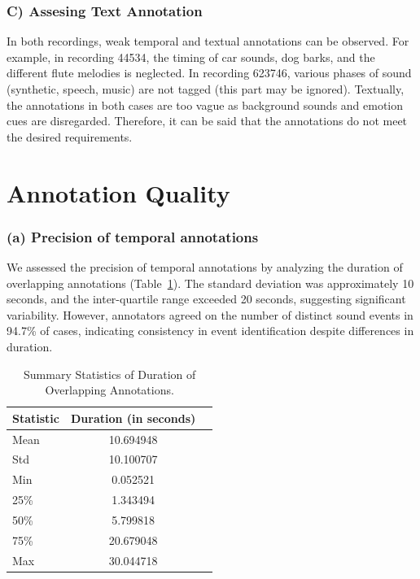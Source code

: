 \documentclass[runningheads]{llncs}
\begin{document}
\subsubsection{C) Assesing Text Annotation}

In both recordings, weak temporal and textual annotations can be observed. For example, in recording 44534, the timing of car sounds, dog barks, and the different flute melodies is neglected. In recording 623746, various phases of sound (synthetic, speech, music) are not tagged (this part may be ignored). Textually, the annotations in both cases are too vague as background sounds and emotion cues are disregarded. Therefore, it can be said that the annotations do not meet the desired requirements.




\section{Annotation Quality}

\subsubsection{(a) Precision of temporal annotations}
We assessed the precision of temporal annotations by analyzing the duration of overlapping annotations (Table~\ref{tab:dur}). The standard deviation was approximately 10 seconds, and the inter-quartile range exceeded 20 seconds, suggesting significant variability.
However, annotators agreed on the number of distinct sound events in 94.7\% of cases, indicating consistency in event identification despite differences in duration. 

\begin{table}[h]
    \caption{Summary Statistics of Duration of Overlapping Annotations.}
    \label{tab:dur}
    \centering
    \begin{tabular}{lcl}
        \toprule
        Statistic & Duration (in seconds) \\ \midrule
        Mean            & 10.694948 \\
        Std             & 10.100707 \\
        Min             & 0.052521 \\
        25\%            & 1.343494 \\
        50\%            & 5.799818 \\
        75\%            & 20.679048 \\ 
        Max             & 30.044718 \\ \bottomrule
    \end{tabular}
\end{table}
\end{document}
